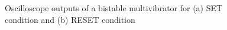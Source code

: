 \begin{enumerate}
\begin{figure}[H]
\begin{subfigure}[b]{0.45\textwidth}
        \caption{}
    \end{subfigure}
    \hfill
    \caption{Oscilloscope outputs of a bistable multivibrator for (a) SET condition and (b) RESET condition}
\end{figure}


\end{enumerate}